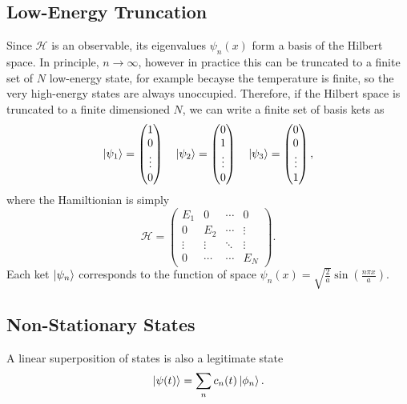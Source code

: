 \documentclass{article}
\begin{document}
\subsection{Low-Energy Truncation}
Since $\mathcal{H}$ is an observable, its eigenvalues $\psi _n(x)$ form a basis of the Hilbert space. In principle, $n \to \infty$, however in practice this can be truncated to a finite set of $N$ low-energy state, for example becayse the temperature is finite, so the very high-energy states are always unoccupied. Therefore, if the Hilbert space is truncated to a finite dimensioned $N$, we can write a finite set of basis kets as
\[
    \ket{\psi _1}=\begin{pmatrix}
        1 \\ 0 \\ \vdots \\ 0
    \end{pmatrix}\quad \ket{\psi _2}=\begin{pmatrix}
        0 \\ 1 \\ \vdots \\ 0
    \end{pmatrix}\quad \ket{\psi _3}=\begin{pmatrix}
        0 \\ 0 \\ \vdots \\ 1
    \end{pmatrix},
\]
where the Hamiltionian is simply
\[
    \mathcal{H}=\begin{pmatrix}
        E_1 & 0 & \cdots & 0 \\
        0 & E_2 & \cdots & \vdots \\
        \vdots & \vdots & \ddots & \vdots \\
        0 & \cdots & \cdots & E_N
    \end{pmatrix}.
\]
Each ket $\ket{\psi _n}$ corresponds to the function of space $\psi _n(x)=\sqrt{\frac{2}{a}}\sin \left( \frac{n\pi x}{a} \right)$.

\subsection{Non-Stationary States}
A linear superposition of states is also a legitimate state
\[
    \ket{\psi (t)}=\sum_{n}c_n(t)\ket{\phi_n}.
\]
\end{document}

